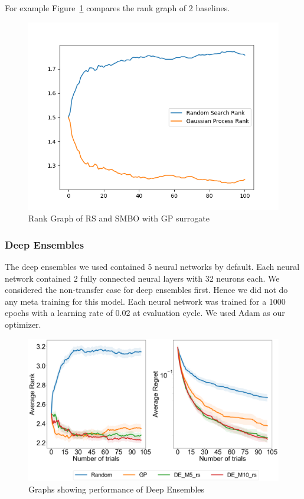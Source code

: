 \documentclass[12pt, twoside, ngerman]{report}
\begin{document}
For example Figure~\ref{fig:RsGpRankGraph} compares the rank graph of 2 baselines.

\begin{figure}[htb]
  \centering
    \includegraphics[scale=0.5]{images/RsGpRankGraph}
    \caption{Rank Graph of RS and SMBO with GP surrogate}
    \label{fig:RsGpRankGraph}
\end{figure}

\subsubsection{Deep Ensembles}

The deep ensembles we used contained 5 neural networks by default.  Each neural network contained 2 fully connected neural layers with 32 neurons each. 
We considered the non-transfer case for deep ensembles first.
Hence we did not do any meta training for this model.
Each neural network was trained for a 1000 epochs with a learning rate of 0.02 at evaluation cycle.
We used Adam as our optimizer.

\begin{figure}[h]
  \centering
    \includegraphics[scale=0.25]{images/DEPerformance}
    \caption{Graphs showing performance of Deep Ensembles}
    \label{fig:DEPerformance}
\end{figure}
\end{document}
